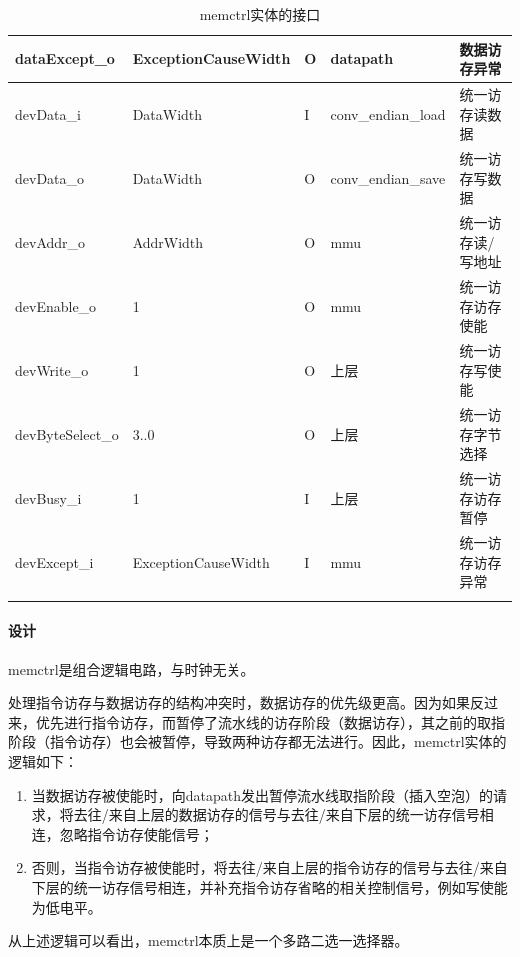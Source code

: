 \documentclass{article}
\begin{document}
\begin{spacing}{1.4}
\begin{longtable}{l|l|l|l|p{5cm}}
\hline dataExcept\_o           & ExceptionCauseWidth    & O     & datapath      & 数据访存异常 \\
\hline devData\_i              & DataWidth              & I     & conv\_endian\_load & 统一访存读数据 \\
\hline devData\_o              & DataWidth              & O     & conv\_endian\_save & 统一访存写数据 \\
\hline devAddr\_o              & AddrWidth              & O     & mmu           & 统一访存读/写地址 \\
\hline devEnable\_o            & 1                      & O     & mmu           & 统一访存访存使能 \\
\hline devWrite\_o             & 1                      & O     & 上层          & 统一访存写使能 \\
\hline devByteSelect\_o        & 3..0                   & O     & 上层          & 统一访存字节选择 \\
\hline devBusy\_i              & 1                      & I     & 上层          & 统一访存访存暂停 \\
\hline devExcept\_i            & ExceptionCauseWidth    & I     & mmu           & 统一访存访存异常 \\
\hline
\caption{memctrl实体的接口}
\label{tb:memctrl-interface}
\end{longtable}

\paragraph{设计}\mbox{}

memctrl是组合逻辑电路，与时钟无关。

处理指令访存与数据访存的结构冲突时，数据访存的优先级更高。因为如果反过来，优先进行指令访存，而暂停了流水线的访存阶段（数据访存），其之前的取指阶段（指令访存）也会被暂停，导致两种访存都无法进行。因此，memctrl实体的逻辑如下：

\begin{enumerate}
    \item 当数据访存被使能时，向datapath发出暂停流水线取指阶段（插入空泡）的请求，将去往/来自上层的数据访存的信号与去往/来自下层的统一访存信号相连，忽略指令访存使能信号；
    \item 否则，当指令访存被使能时，将去往/来自上层的指令访存的信号与去往/来自下层的统一访存信号相连，并补充指令访存省略的相关控制信号，例如写使能为低电平。
\end{enumerate}

从上述逻辑可以看出，memctrl本质上是一个多路二选一选择器。


\end{spacing}
\end{document}

